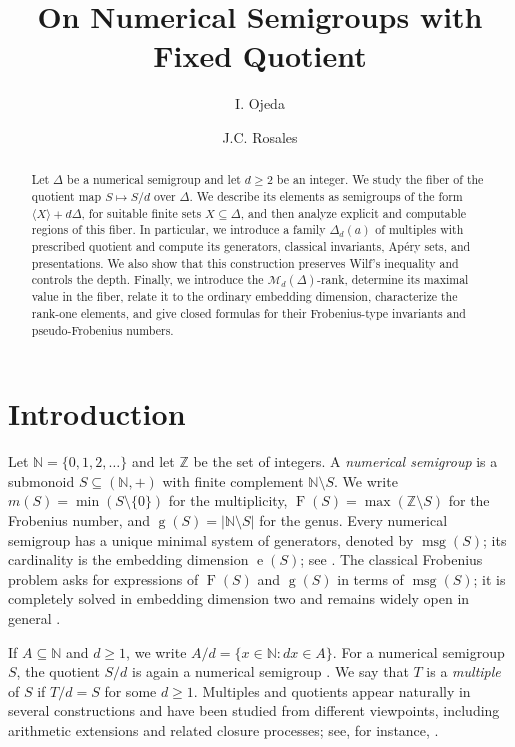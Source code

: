 \documentclass[12pt,a4paper]{amsart}
\title{On Numerical Semigroups with Fixed Quotient}
\author{I. Ojeda}
\author{J.C. Rosales}
\theoremstyle{definition}
\theoremstyle{remark}
\begin{document}
\begin{abstract}
Let $\Delta$ be a numerical semigroup and let $d\ge 2$ be an integer. We study the fiber of the quotient map \(S\mapsto S/d\) over $\Delta$. We describe its elements as semigroups of the form $\langle X\rangle+d\Delta$, for suitable finite sets $X\subseteq\Delta$, and then analyze explicit and computable regions of this fiber. In particular, we introduce a family $\Delta_d(a)$ of multiples with prescribed quotient and compute its generators, classical invariants, Ap\'ery sets, and presentations. We also show that this construction preserves Wilf's inequality and controls the depth. Finally, we introduce the $\mathcal{M}_d(\Delta)$-rank, determine its maximal value in the fiber, relate it to the ordinary embedding dimension, characterize the rank-one elements, and give closed formulas for their Frobenius-type invariants and pseudo-Frobenius numbers.
\end{abstract}

\maketitle


\section{Introduction}

Let $\mathbb{N}=\{0,1,2,\dots\}$ and let $\mathbb{Z}$ be the set of integers. A \emph{numerical semigroup} is a submonoid $S\subseteq(\mathbb{N},+)$ with finite complement $\mathbb{N}\setminus S$. We write $m(S)=\min(S\setminus\{0\})$ for the multiplicity, $\operatorname{F}(S)=\max(\mathbb{Z}\setminus S)$ for the Frobenius number, and $\operatorname{g}(S)=|\mathbb{N}\setminus S|$ for the genus. Every numerical semigroup has a unique minimal system of generators, denoted by $\operatorname{msg}(S)$; its cardinality is the embedding dimension $\operatorname{e}(S)$; see \cite[Theorem~2.7]{book}. The classical Frobenius problem asks for expressions of $\operatorname{F}(S)$ and $\operatorname{g}(S)$ in terms of $\operatorname{msg}(S)$; it is completely solved in embedding dimension two and remains widely open in general \cite{sylvester,alfonsin}.

If $A\subseteq\mathbb{N}$ and $d\ge 1$, we write $A/d=\{x\in\mathbb{N}:dx\in A\}$. For a numerical semigroup $S$, the quotient $S/d$ is again a numerical semigroup \cite{proportionally}. We say that $T$ is a \emph{multiple} of $S$ if $T/d=S$ for some $d\ge 1$. Multiples and quotients appear naturally in several constructions and have been studied from different viewpoints, including arithmetic extensions and related closure processes; see, for instance, \cite{cim,australian,ojeda3}.
\end{document}
